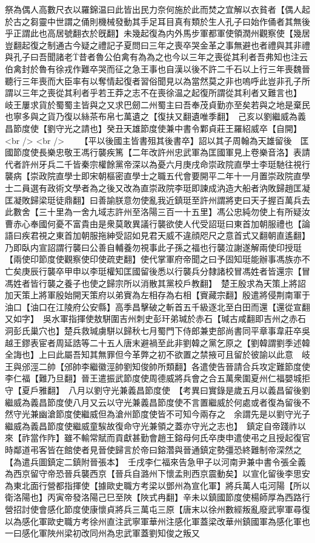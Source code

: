祭為偶人高數尺衣以羅錦温曰此皆出民力奈何施於此而焚之宜解以衣貧者【偶人起於古之芻靈中世謂之俑則機械發動其手足耳目真有類於生人孔子曰始作俑者其無後乎正謂此也高居號翻衣於旣翻】未幾起復為内外馬步軍都軍使領潤州觀察使【幾居豈翻起復之制通古今疑之禮記子夏問曰三年之喪卒哭金革之事無避也者禮與其非禮與孔子曰吾聞諸老昔者魯公伯禽有為為之也今以三年之喪從其利者吾弗知也注云伯禽封於魯有徐戎作難卒哭而征之急王事也自漢以後不許二千石以上行三年喪魏晉聽行三年喪而大臣率有以奪情起復者習俗聞見以為當然莫之非也嗚呼此豈非孔子所謂以三年之喪從其利者乎若王莽之志不在喪徐温之起復所謂從其利者又難言也】　岐王屢求貨於蜀蜀主皆與之又求巴劒二州蜀主曰吾奉茂貞勤亦至矣若與之地是棄民也寧多與之貨乃復以絲茶布帛七萬遺之【復扶又翻遺唯季翻】　己亥以劉繼威為義昌節度使【劉守光之請也】癸丑天雄節度使兼中書令鄴貞莊王羅紹威卒【自開】<br />
<br />
　　【平以後國主皆書殂其後書卒】詔以其子周翰為天雄留後　匡國節度使長樂忠敬王馮行襲疾篤【二年改許州忠武軍為匡國軍見上卷樂音洛】表請代者許州牙兵二千皆秦宗權餘黨帝深以為憂六月庚戌命崇政院直學士李珽馳往視行襲病【崇政院直學士即宋朝樞密直學士之職五代會要開平二年十一月置崇政院直學士二員選有政術文學者為之後又改為直崇政院李珽即諫成汭造大船者汭敗歸趙匡凝匡凝敗歸梁珽徒鼎翻】曰善諭朕意勿使亂我近鎮珽至許州謂將吏曰天子握百萬兵去此數舍【三十里為一舍九域志許州至洛陽三百一十五里】馮公忠純勿使上有所疑汝曹赤心奉國何憂不富貴由是衆莫敢異議行襲欲使人代受詔珽曰東首加朝服禮也【論語曰疾君視之東首加朝服拖紳受詔如見君天威不違顔咫尺之意首式又翻朝直遙翻】乃即臥内宣詔謂行襲曰公善自輔養勿視事此子孫之福也行襲泣謝遂解兩使印授珽【兩使印節度使觀察使印使疏吏翻】使代掌軍府帝聞之曰予固知珽能辦事馮族亦不亡矣庚辰行襲卒甲申以李珽權知匡國留後悉以行襲兵分隸諸校冒馮姓者皆還宗【冒馮姓者皆行襲之養子也使之歸宗所以消散其黨校戶教翻】　楚王殷求為天策上將詔加天策上將軍殷始開天策府以弟賨為左相存為右相【賨藏宗翻】殷遣將侵荆南軍于油口【油口在江陵府公安縣】高季昌擊破之斬首五千級逐北至白田而還【還從宣翻又如字】　吳水軍指揮使敖駢圍吉州刺史彭玕弟瑊於赤石【瑊古咸翻即吉州之赤石洞彭氏巢穴也】楚兵救瑊虜駢以歸秋七月蜀門下侍郎兼吏部尚書同平章事韋莊卒吳越王鏐表宦者周延誥等二十五人唐末避禍至此非劉韓之黨乞原之【劉韓謂劉季述韓全誨也】上曰此屬吾知其無罪但今革弊之初不欲置之禁掖可且留於彼諭以此意　岐王與邠涇二帥【邠帥李繼徽涇帥劉知俊帥所類翻】各遣使告晉請合兵攻定難節度使李仁福【難乃旦翻】晉王遣振武節度使周德威將兵會之合五萬衆圍夏州仁福嬰城拒守【夏戶雅翻】　八月以劉守光兼義昌節度使　【考異曰實錄是歲五月以義昌留後劉繼威為義昌節度使八月又云以守光兼義昌節度使不言置繼威於何處或者復為留後不然守光兼幽滄節度使繼威但為滄州節度使皆不可知今兩存之　余謂先是以劉守光子繼威為義昌節度使繼威童騃故復命守光兼領之蓋亦守光之志也】　鎮定自帝踐祚以來【祚當作阼】雖不輸常賦而貢獻甚勤會趙王鎔母何氏卒庚申遣使弔之且授起復官時鄰道弔客皆在館使者見晉使歸言於帝曰鎔濳與晉通鎮定勢彊恐終難制帝深然之【為遣兵圖鎮定二鎮附晉張本】　壬戌李仁福來告急甲子以河南尹兼中書令張全義為西京留守帝恐晉兵襲西京【晉兵自潞州下懷孟則西京震動矣】以宣化留後李思安為東北面行營都指揮使【據歐史職方考梁以鄧州為宣化軍】將兵萬人屯河陽【所以衛洛陽也】丙寅帝發洛陽己巳至陜【陜式冉翻】辛未以鎮國節度使楊師厚為西路行營招討使會感化節度使康懷貞將兵三萬屯三原【唐末以徐州數經叛亂廢武寧軍尋復以為感化軍歐史職方考徐州直注武寧軍華州注感化軍蓋梁改華州鎮國軍為感化軍也一曰感化軍陜州梁初改同州為忠武軍蓋劉知俊之叛又